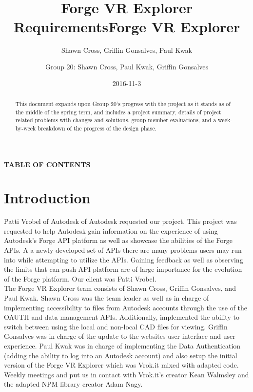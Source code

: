 \documentclass[letterpaper, 10pt, draftclsnofoot, compsoc, onecolumn]{IEEEtran}
\title{Forge VR Explorer Requirements}
\author{Shawn Cross, Griffin Gonsalves, Paul Kwak}
\date{2016-11-3}
\begin{document}
\title{Forge VR Explorer}
\author{Group 20: Shawn Cross, Paul Kwak, Griffin Gonsalves}
\maketitle
\hspace*{\fill}\hspace*{\fill}
\vspace{2cm}
\begin{abstract}
This document expands upon Group 20's progress with the project as it stands as of the middle of the spring term, and includes a project summary, details of project related problems with changes and solutions, group member evaluations, and a week-by-week breakdown of the progress of the design phase. 
\end{abstract}
\IEEEpeerreviewmaketitle

\newpage
{}

{\centering{}\bfseries\color{black}
TABLE OF CONTENTS
\par}

\bigskip

\setcounter{tocdepth}{2}
\renewcommand\contentsname{}
\tableofcontents

\bigskip
\clearpage

\section{Introduction}
 Patti Vrobel of Autodesk of Autodesk requested our project. This project was requested to help Autodesk gain information on the experience of using Autodesk's Forge API platform as well as showcase the abilities of the Forge APIs. A a newly developed set of APIs there are many problems users may run into while attempting to utilize the APIs. Gaining feedback as well as observing the limits that can push API platform are of large importance for the evolution of the Forge platform. Our client was Patti Vrobel. \\

The Forge VR Explorer team consists of Shawn Cross, Griffin Gonsalves, and Paul Kwak. Shawn Cross was the team leader as well as in charge of implementing accessibility to files from Autodesk accounts through the use of the OAUTH and data management APIs. Additionally, implemented the ability to switch between using the local and non-local CAD files for viewing. Griffin Gonsalves was in charge of the update to the websites user interface and user experience. Paul Kwak was in charge of implementing the Data Authentication (adding the ability to log into an Autodesk account) and also setup the initial version of the Forge VR Explorer which was Vrok.it mixed with adapted code. Weekly meetings and put us in contact with Vrok.it's creator Kean Walmsley and the adapted NPM library creator Adam Nagy.
\end{document}
